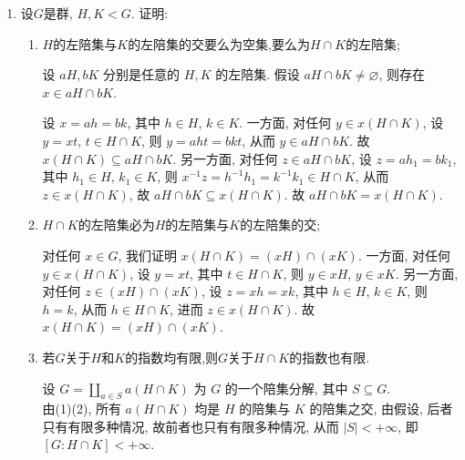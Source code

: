 \begin{enumerate}
\begin{enumerate}[label=(\arabic*)]
如果是,给出证明;否则,给出反例.
\begin{solution}
    是.
    设 $G/N$ 的一个生成元为 $xN$.
    任取 $g,h \in G$,
    则存在 $a,b \in \mathbb{N}$ 使得 $g\in x^aN$, $h\in x^bN$,
    从而存在 $n,m\in N$ 使得 $g=x^an$, $h=x^bm$. 
    于是, 由 $N\subseteq C(G)$ 知,
    $$gh = x^a (n x^b) m = x^{a+b} (n m) = x^b (x^a m) n = (x^b m)(x^a n) = hg.$$
    故 $G$ 是 Abel 群.
\end{solution}
\end{enumerate}


\item 设$G$是群, $H,K < G$. 证明:
\begin{enumerate}[label=(\arabic*)]
\item $H$的左陪集与$K$的左陪集的交要么为空集,要么为$H \cap K$的左陪集;
\begin{solution}
    设 $aH, bK$ 分别是任意的 $H, K$ 的左陪集.
    假设 $aH\cap bK\not= \varnothing$,
    则存在 $x\in aH \cap bK$.

    设 $x=ah=bk$, 其中 $h\in H$, $k\in K$.    
    一方面, 对任何 $y \in x(H \cap K)$,
    设 $y=xt$, $t\in H \cap K$,
    则 $y=aht=bkt$, 从而 $y\in aH\cap bK$.
    故 $x(H\cap K) \subseteq aH\cap bK$.
    另一方面, 对任何 $z\in aH\cap bK$,
    设 $z=ah_1=bk_1$, 其中 $h_1\in H$, $k_1\in K$,
    则 $x^{-1}z=h^{-1}h_1=k^{-1}k_1\in H\cap K$,
    从而 $z\in x(H\cap K)$,
    故 $aH\cap bK\subseteq x(H\cap K)$.
    故 $aH\cap bK = x(H\cap K)$.
\end{solution}

\item $H \cap K$的左陪集必为$H$的左陪集与$K$的左陪集的交;
\begin{solution}
    对任何 $x\in G$, 我们证明 $x(H\cap K) = (xH) \cap (xK)$.
    一方面, 对任何 $y \in x(H\cap K)$,
    设 $y=xt$, 其中 $t\in H\cap K$,
    则 $y\in xH$, $y\in xK$. 
    另一方面, 对任何 $z\in (xH) \cap (xK)$,
    设 $z=xh=xk$, 其中 $h\in H$, $k\in K$,
    则 $h=k$, 从而 $h\in H\cap K$,
    进而 $z\in x(H\cap K)$.
    故 $x(H\cap K)=(xH) \cap (xK)$. 
\end{solution}

\item 若$G$关于$H$和$K$的指数均有限,则$G$关于$H \cap K$的指数也有限.
\begin{solution}
    设 $G=\coprod\limits_{a\in S}a(H \cap K)$ 为 $G$ 的一个陪集分解,
    其中 $S\subseteq G$. \\
    由(1)(2), 所有 $a(H\cap K)$ 均是 $H$ 的陪集与 $K$ 的陪集之交,
    由假设, 后者只有有限多种情况, 故前者也只有有限多种情况,
    从而 $|S|<+\infty$, 即 $[G:H\cap K]<+\infty$. 
\end{solution}
\end{enumerate}


\end{enumerate}
